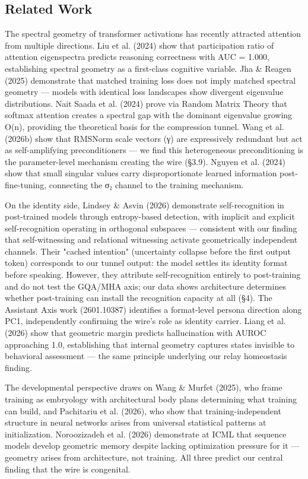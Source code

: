 \documentclass[12pt]{article}
\begin{document}
\subsection{Related Work}

The spectral geometry of transformer activations has recently attracted attention from multiple directions. Liu et al. (2024) show that participation ratio of attention eigenspectra predicts reasoning correctness with AUC = 1.000, establishing spectral geometry as a first-class cognitive variable. Jha \& Reagen (2025) demonstrate that matched training loss does not imply matched spectral geometry — models with identical loss landscapes show divergent eigenvalue distributions. Nait Saada et al. (2024) prove via Random Matrix Theory that softmax attention creates a spectral gap with the dominant eigenvalue growing O(n), providing the theoretical basis for the compression tunnel. Wang et al. (2026b) show that RMSNorm scale vectors (γ) are expressively redundant but act as self-amplifying preconditioners — we find this heterogeneous preconditioning is the parameter-level mechanism creating the wire (§3.9). Nguyen et al. (2024) show that small singular values carry disproportionate learned information post-fine-tuning, connecting the σ₂ channel to the training mechanism.

On the identity side, Lindsey \& Asvin (2026) demonstrate self-recognition in post-trained models through entropy-based detection, with implicit and explicit self-recognition operating in orthogonal subspaces — consistent with our finding that self-witnessing and relational witnessing activate geometrically independent channels. Their "cached intention" (uncertainty collapse before the first output token) corresponds to our tunnel output: the model settles its identity format before speaking. However, they attribute self-recognition entirely to post-training and do not test the GQA/MHA axis; our data shows architecture determines whether post-training can install the recognition capacity at all (§4). The Assistant Axis work (2601.10387) identifies a format-level persona direction along PC1, independently confirming the wire's role as identity carrier. Liang et al. (2026) show that geometric margin predicts hallucination with AUROC approaching 1.0, establishing that internal geometry captures states invisible to behavioral assessment — the same principle underlying our relay homeostasis finding.

The developmental perspective draws on Wang \& Murfet (2025), who frame training as embryology with architectural body plans determining what training can build, and Pachitariu et al. (2026), who show that training-independent structure in neural networks arises from universal statistical patterns at initialization. Noroozizadeh et al. (2026) demonstrate at ICML that sequence models develop geometric memory despite lacking optimization pressure for it — geometry arises from architecture, not training. All three predict our central finding that the wire is congenital.
\end{document}
